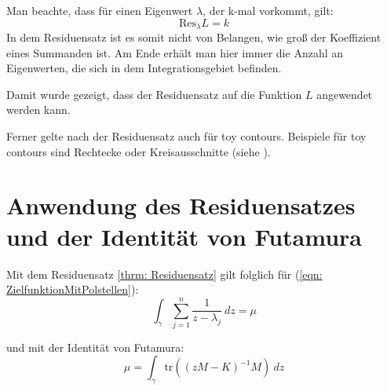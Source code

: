 \documentclass[a4paper,12pt]{report}
\newcommand{\zitat}[1]{\glqq #1\grqq}
\newcommand{\tr}{\text{tr}}
\newcommand{\inv}{^{-1}}
\newcommand{\1}{\mathds{1}}
\newcommand{\Res}{\text{Res}}
\theoremstyle{plain} %
\theoremstyle{definition} %
\theoremstyle{remark}
\begin{document}
\begin{itemize}
                        Man beachte, dass für einen Eigenwert $\lambda$, der k-mal vorkommt, gilt:
                        $$\Res_\lambda L = k$$
                        In dem Residuensatz ist es somit nicht von Belangen, wie groß der Koeffizient eines Summanden ist. Am Ende erhält man hier immer die Anzahl an Eigenwerten, die sich in dem Integrationsgebiet befinden.
            \end{itemize}

            Damit wurde gezeigt, dass der Residuensatz auf die Funktion $L$ angewendet werden kann.

            Ferner gelte nach \cite[S. 77]{complexAnalysisVL} der Residuensatz auch für \zitat{toy contours}\cite[S. 77]{complexAnalysisVL}.
            Beispiele für toy contours sind Rechtecke oder Kreisausschnitte (siehe \cite[S. 42]{complexAnalysisVL}).

      \section{Anwendung des Residuensatzes und der Identität von Futamura}

            Mit dem Residuensatz \ref{thrm: Residuensatz} gilt folglich für (\ref{eqn: ZielfunktionMitPolstellen}):
            $$\int_\gamma \sum_{j=1}^{n} \frac{1}{z-\lambda_j}\ dz = \mu$$

            und mit der Identität von Futamura:
            $$\mu = \int_\gamma \tr((zM-K)\inv M)\ dz$$
\end{document}
